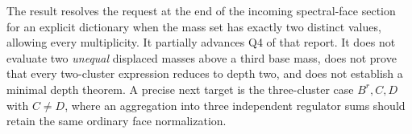 The result resolves the request at the end of the incoming
spectral-face section for an explicit dictionary when the mass set
has exactly two distinct values, allowing every multiplicity.  It
partially advances Q4 of that report.  It does not evaluate two
\emph{unequal} displaced masses above a third base mass, does not
prove that every two-cluster expression reduces to depth two, and
does not establish a minimal depth theorem.  A precise next target
is the three-cluster case $B^r,C,D$ with $C\ne D$, where an
aggregation into three independent regulator sums should retain
the same ordinary face normalization.

